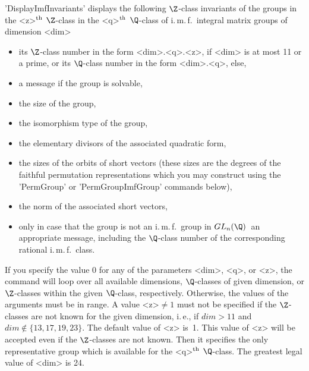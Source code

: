 'DisplayImfInvariants'  displays the  following $\Z$-class invariants  of
the   groups in the  <z>$^{\rm   th}$  $\Z$-class  in the  <q>$^{\rm th}$
$\Q$-class of i.\,m.\,f.~integral matrix groups of dimension <dim>\:
\begin{itemize}
\item its  $\Z$-class number  in the form  <dim>.<q>.<z>,  if <dim> is at
      most 11 or a prime, or its $\Q$-class number in the form <dim>.<q>,
      else, \vspace{-2mm}
\item a message if the group is solvable, \vspace{-2mm}
\item the size of the group, \vspace{-2mm}
\item the isomorphism type of the group, \vspace{-2mm}
\item the   elementary  divisors   of  the   associated  quadratic  form,
      \vspace{-2mm}
\item the sizes  of the  orbits  of short vectors  (these  sizes  are the
      degrees of the  faithful permutation representations  which you may
      construct using the  'PermGroup'  or  'PermGroupImfGroup'  commands
      below), \vspace{-2mm}
\item the norm of the associated short vectors, \vspace{-2mm}
\item only  in  case  that  the  group  is  not  an  i.\,m.\,f.~group  in
      $GL_n(\Q)$\:\  an  appropriate  message,  including the  $\Q$-class
      number    of   the    corresponding   rational    i.\,m.\,f.~class.
      \vspace{-2mm}
\end{itemize}
If you specify the value 0 for any of  the parameters <dim>, <q>, or <z>,
the command will loop  over   all available dimensions, $\Q$-classes   of
given   dimension,    or $\Z$-classes    within  the  given   $\Q$-class,
respectively. Otherwise, the values of the arguments must be in range.  A
value <z>$ \neq  1$  must not be specified  if  the $\Z$-classes are  not
known  for the given dimension,  i.\,e., if $dim > 11$  and $dim \not \in
\{13,17,19,23\}$. The default value  of <z> is~1. This  value of <z> will
be accepted even if the $\Z$-classes are not known. Then it specifies the
only representative group  which   is available for the    <q>$^{\rm th}$
$\Q$-class. The greatest legal value of <dim> is 24.


